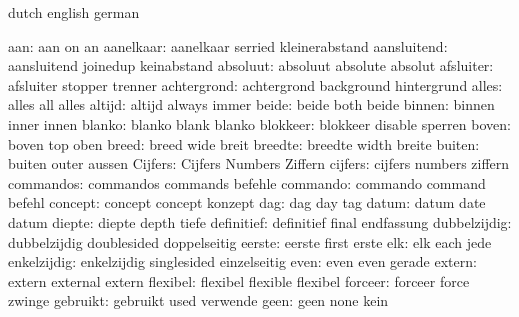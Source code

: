 
\startvariables       dutch                english             german

                aan:  aan                  on                  an
          aanelkaar:  aanelkaar            serried             kleinerabstand
        aansluitend:  aansluitend          joinedup            keinabstand
           absoluut:  absoluut             absolute            absolut
          afsluiter:  afsluiter            stopper             trenner
        achtergrond:  achtergrond          background          hintergrund
              alles:  alles                all                 alles
             altijd:  altijd               always              immer
              beide:  beide                both                beide
             binnen:  binnen               inner               innen
             blanko:  blanko               blank               blanko
           blokkeer:  blokkeer             disable             sperren
              boven:  boven                top                 oben
              breed:  breed                wide                breit
            breedte:  breedte              width               breite
             buiten:  buiten               outer               aussen
            Cijfers:  Cijfers              Numbers             Ziffern
            cijfers:  cijfers              numbers             ziffern
          commandos:  commandos            commands            befehle
           commando:  commando             command             befehl
            concept:  concept              concept             konzept
                dag:  dag                  day                 tag
              datum:  datum                date                datum
             diepte:  diepte               depth               tiefe
         definitief:  definitief           final               endfassung
       dubbelzijdig:  dubbelzijdig         doublesided         doppelseitig
             eerste:  eerste               first               erste
                elk:  elk                  each                jede
        enkelzijdig:  enkelzijdig          singlesided         einzelseitig
               even:  even                 even                gerade
             extern:  extern               external            extern
           flexibel:  flexibel             flexible            flexibel
            forceer:  forceer              force               zwinge
           gebruikt:  gebruikt             used                verwende
               geen:  geen                 none                kein
